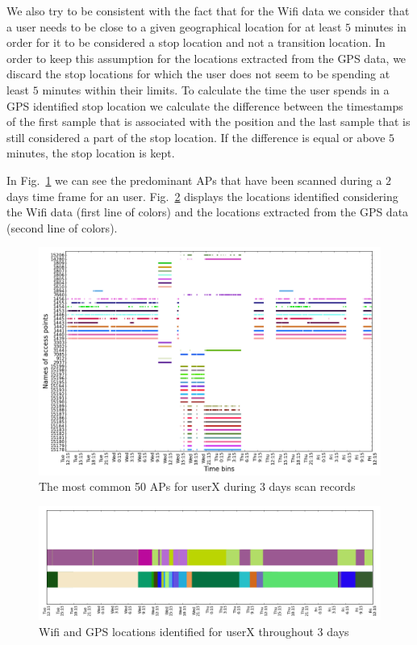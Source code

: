 We also try to be consistent with the fact that for the Wifi data we consider
that a user needs to be close to a given geographical location for at least $5$
minutes in order for it to be considered a stop location and not a transition
location. In order to keep this assumption for the locations extracted from the
GPS data, we discard the stop locations for which the user does not seem to be
spending at least $5$ minutes within their limits. To calculate the time the
user spends in a GPS identified stop location we calculate the difference
between the timestamps of the first sample that is associated with the position
and the last sample that is still considered a part of the stop location. If the
difference is equal or above $5$ minutes, the stop location is kept.

In Fig.~\ref{user6_aps_2days} we can see the predominant APs that have been
scanned during a $2$ days time frame for an user. Fig.~\ref{user6_hmm_2days}
displays the locations identified considering the Wifi data (first line of
colors) and the locations extracted from the GPS data (second line of colors).

\begin{figure}[!h]
\centering
\includegraphics[width=\textwidth]{figures/gps/user_6_sorted_3days_no_rssi_plot.png}
\caption{The most common 50 APs for userX during 3 days scan records}
\label{user6_aps_2days}
\end{figure}

\begin{figure}[!h]
\centering
\includegraphics[width=\textwidth]{figures/gps/user_6_hmm_and_gps.png}
\caption{Wifi and GPS locations identified for userX throughout 3 days}
\label{user6_hmm_2days}
\end{figure}

